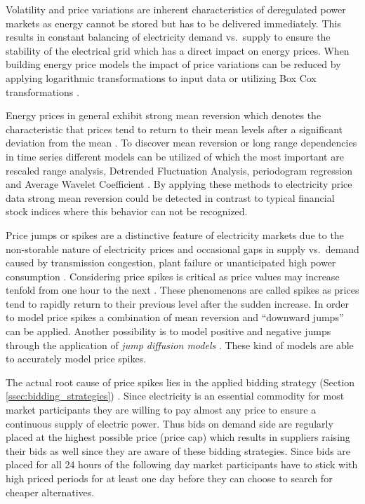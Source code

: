Volatility and price variations are inherent characteristics of deregulated power markets as energy cannot be stored but has to be delivered immediately. This results in constant balancing of electricity demand vs.~supply to ensure the stability of the electrical grid which has a direct impact on energy prices. When building energy price models the impact of price variations can be reduced by applying logarithmic transformations to input data or utilizing Box Cox transformations \cite{weron2005forecasting, box1964analysis}. 

Energy prices in general exhibit strong mean reversion which denotes the characteristic that prices tend to return to their mean levels after a significant deviation from the mean \cite{weron2004modelingmarkets,weron2007modeling}. To discover mean reversion or long range dependencies in time series different models can be utilized of which the most important are rescaled range analysis, Detrended Fluctuation Analysis, periodogram regression and Average Wavelet Coefficient \cite{weron2007modeling}. By applying these methods to electricity price data strong mean reversion could be detected in contrast to typical financial stock indices where this behavior can not be recognized. 


Price jumps or spikes are a distinctive feature of electricity markets due to the non-storable nature of electricity prices and occasional gaps in supply vs.~demand caused by transmission congestion, plant failure or unanticipated high power consumption \cite{weron2004modelingmarkets, weron2007modeling}. 
Considering price spikes is critical as price values may increase tenfold from one hour to the next \cite{huisman2007hourly}. 
These phenomenons are called spikes as prices tend to rapidly return to their previous level after the sudden increase. In order to model price spikes a combination of mean reversion and "`downward jumps"' can be applied. Another possibility is to model positive and negative jumps through the application of \textit{jump diffusion models} \cite{weron2004modeling}. These kind of models are able to accurately model price spikes. 

The actual root cause of price spikes lies in the applied bidding strategy (Section \ref{ssec:bidding_strategies}) \cite{weron2007modeling}. Since electricity is an essential commodity for most market participants they are willing to pay almost any price to ensure a continuous supply of electric power. Thus bids on demand side are regularly placed at the highest possible price (price cap) which results in suppliers raising their bids as well since they are aware of these bidding strategies. Since bids are placed for all 24 hours of the following day market participants have to stick with high priced periods for at least one day before they can choose to search for cheaper alternatives. 



